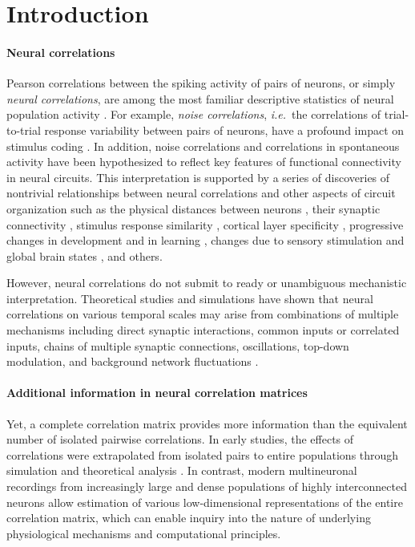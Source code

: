 \documentclass[10pt]{article}
\begin{document}
\section*{Introduction}
\paragraph{Neural correlations}
Pearson correlations between the spiking activity of pairs of neurons, or simply \emph{neural correlations}, are among the most familiar descriptive statistics of neural population activity \cite{Averbeck:2006, Zohary:1994, Kohn:2005, Bair:2001, Ecker:2010}.  For example, \emph{noise correlations}, \emph{i.e.}~the correlations of trial-to-trial response variability between pairs of neurons, have a profound impact on stimulus coding \cite{Zohary:1994, Abbott:1999, Sompolinsky:2001, Averbeck:2006, Josic:2009, Berens:2011, Ecker:2011}. In addition, noise correlations and correlations in spontaneous activity have been hypothesized to reflect key features of functional connectivity in neural circuits.  This interpretation is supported by a series of discoveries of nontrivial relationships between neural correlations and other aspects of circuit organization such as the physical distances between neurons \cite{Smith:2008,Denman:2013}, their synaptic connectivity \cite{Ko:2011},  stimulus response similarity \cite{Bair:2001, Arieli:1995, Chiu:2002, Kenet:2003, Kohn:2005, Cohen:2008, Cohen:2009, Ko:2011, Smith:2013b}, cortical layer specificity \cite{Hansen:2012,Smith:2013}, progressive changes in development and in learning \cite{Golshani:2009,Gu:2011}, changes due to sensory stimulation and global brain states \cite{Goard:2009, Kohn:2009, Ecker:2010, Renart:2010}, and others.

However, neural correlations do not submit to ready or unambiguous mechanistic interpretation.  Theoretical studies and simulations have shown that neural correlations on various temporal scales may arise from combinations of multiple mechanisms including direct synaptic interactions, common inputs or correlated inputs, chains of multiple synaptic connections, oscillations, top-down modulation, and background network fluctuations \cite{Perkel:1967b, Moore:1970, Shadlen:1998, Salinas:2001, Ostojic:2009, Rosenbaum:2011}. 

\paragraph{Additional information in neural correlation matrices}
Yet, a complete correlation matrix provides more information than the equivalent number of isolated pairwise correlations. In early studies, the effects of correlations were extrapolated from isolated pairs to entire populations through simulation and theoretical analysis \cite{Shadlen:1998, Zohary:1994}. In contrast, modern multineuronal recordings from increasingly large and dense populations of highly interconnected neurons allow estimation of various low-dimensional representations of the entire correlation matrix, which can enable inquiry into the nature of underlying physiological mechanisms and computational principles.  
\end{document}
